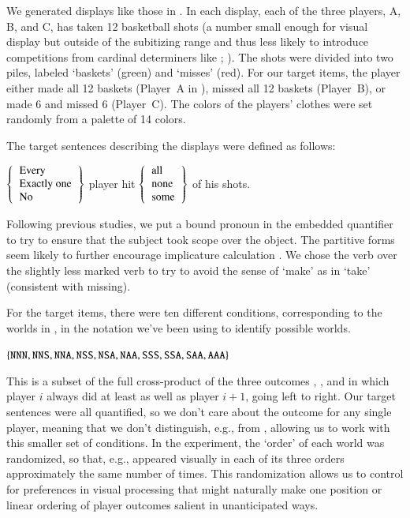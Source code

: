 \documentclass[leqno,12pt]{article}
\begin{document}
We generated displays like those in . In
each display, each of the three players, A, B, and C, has taken 12
basketball shots (a number small enough for visual display but outside
of the subitizing range and thus less likely to introduce competitions
from cardinal determiners like ;
\citealt{Degen:Tanenhaus:2014}). The shots were divided into two
piles, labeled `baskets' (green) and `misses' (red).  For our target
items, the player either made all 12 baskets (Player~A in
), missed all 12 baskets (Player~B), or
made 6 and missed 6 (Player~C). The colors of the players' clothes
were set randomly from a palette of 14 colors.

The target sentences describing the displays were defined as follows:
%
\begin{examples}
\item\label{expmsgs} 
  $\set{
      \begin{tabular}[c]{l}
        Every \\
        Exactly one \\
        No 
      \end{tabular}}$
    player hit 
    $\set{
      \begin{tabular}[c]{l}
        all \\
        none \\
        some 
      \end{tabular}}$
    of his shots.  
\end{examples}
%
Following previous studies, we put a bound pronoun in the embedded
quantifier to try to ensure that the subject took scope over the
object. The partitive forms seem likely to further encourage
implicature calculation
\citep{reed:1991-interpreting,Grodner-etal:2010,Degen:2015}. We chose
the verb  over the slightly less marked verb  to
try to avoid the sense of `make' as in `take' (consistent with
missing).

For the target items, there were ten different conditions,
corresponding to the worlds in , in the notation we've been
using to identify possible worlds.
%
\begin{examples}
\item\label{conds} $\left\{ \texttt{NNN}, \texttt{NNS}, \texttt{NNA},
    \texttt{NSS}, \texttt{NSA}, \texttt{NAA}, \texttt{SSS}, \texttt{SSA},
    \texttt{SAA}, \texttt{AAA} \right\}$
\end{examples}
%
This is a subset of the full cross-product of the three outcomes
, , and  in which player $i$ always did at
least as well as player $i+1$, going left to right.  Our target
sentences were all quantified, so we don't care about the outcome for
any single player, meaning that we don't distinguish, e.g.,
 from , allowing us to work with this smaller
set of conditions. In the experiment, the `order' of each world was
randomized, so that, e.g.,  appeared visually in each of
its three orders approximately the same number of times. This
randomization allows us to control for preferences in visual
processing that might naturally make one position or linear ordering
of player outcomes salient in unanticipated ways.
\end{document}
